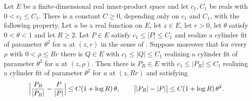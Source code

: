 \begin{lemma}
Let $E$ be a finite-dimensional real inner-product space and let $c_1,C_1$ be reals
with $0<c_1\le C_1$. There is a constant $C\ge0$, depending only on $c_1$ and $C_1$,
with the following property. Let $u$ be a real function on $E$, let $z\in E$, let
$r>0$, let $\theta$ satisfy $0<\theta<1$ and let $R\ge2$. Let $P\in E$ satisfy
$c_1\le|P|\le C_1$ and realize a cylinder fit of parameter $\theta^2$ for $u$ at
$(z,r)$ in the sense of . Suppose moreover that for every
$\rho$ with $0<\rho\le Rr$ there is $Q\in E$ with $c_1\le|Q|\le C_1$ realizing a
cylinder fit of parameter $\theta^2$ for $u$ at $(z,\rho)$. Then there is $P_R\in E$
with $c_1\le|P_R|\le C_1$ realizing a cylinder fit of parameter $\theta^2$ for $u$ at
$(z,Rr)$ and satisfying
\[
  \Bigl|\frac{P_R}{|P_R|}-\frac{P}{|P|}\Bigr|\le C(1+\log R)\,\theta,
  \qquad \bigl||P_R|-|P|\bigr|\le C(1+\log R)\,\theta^2 .
\]
\end{lemma}
